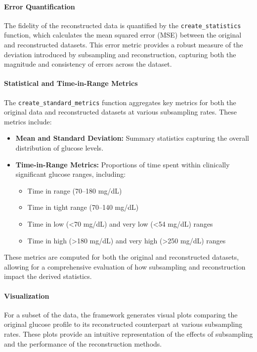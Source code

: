 \paragraph{Error Quantification}
The fidelity of the reconstructed data is quantified by the \texttt{create\_statistics} function, which calculates the mean squared error (MSE) between the original and reconstructed datasets. This error metric provides a robust measure of the deviation introduced by subsampling and reconstruction, capturing both the magnitude and consistency of errors across the dataset.

\paragraph{Statistical and Time-in-Range Metrics}
The \texttt{create\_standard\_metrics} function aggregates key metrics for both the original data and reconstructed datasets at various subsampling rates. These metrics include:
\begin{itemize}
	\item \textbf{Mean and Standard Deviation:} Summary statistics capturing the overall distribution of glucose levels.
	\item \textbf{Time-in-Range Metrics:} Proportions of time spent within clinically significant glucose ranges, including:
	\begin{itemize}
		\item Time in range (70–180 mg/dL)
		\item Time in tight range (70–140 mg/dL)
		\item Time in low (<70 mg/dL) and very low (<54 mg/dL) ranges
		\item Time in high (>180 mg/dL) and very high (>250 mg/dL) ranges
	\end{itemize}
\end{itemize}
These metrics are computed for both the original and reconstructed datasets, allowing for a comprehensive evaluation of how subsampling and reconstruction impact the derived statistics.

\paragraph{Visualization}
For a subset of the data, the framework generates visual plots comparing the original glucose profile to its reconstructed counterpart at various subsampling rates. These plots provide an intuitive representation of the effects of subsampling and the performance of the reconstruction methods.

